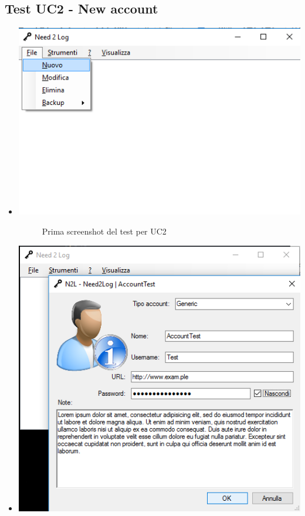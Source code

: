 \documentclass[a4paper,10pt]{report}
\begin{document}
			\subsection{Test UC2 - New account}
				\begin{itemize}
					\item[] {
						\begin{center}
							\includegraphics[scale=1]{immagini/test/testUC2_1.png}
							\end{center}
						\begin{figure}[!h]
								\caption{Prima screenshot del test per UC2}
							\end{figure}}
					\item[] {
						\begin{center}
							\includegraphics[scale=1]{immagini/test/testUC2_2.png}

\end{center}}
\end{itemize}
\end{document}
